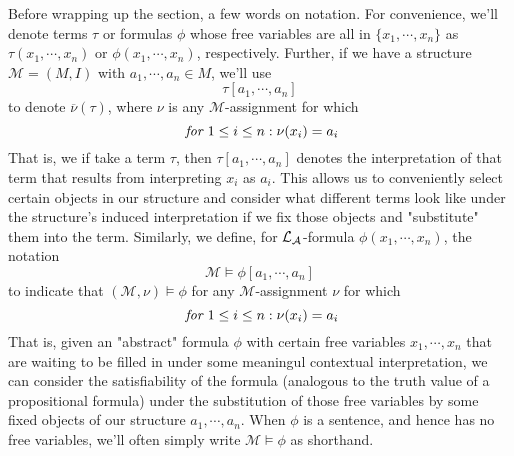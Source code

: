 \documentclass{article}
\begin{document}
\nn
Before wrapping up the section, a few words on notation. For convenience, we'll denote terms $ \tau $ or formulas $ \phi $ whose free variables are all in $ \{ x_1, \cdots, x_n \} $ as $ \tau(x_1, \cdots, x_n) $ or $ \phi(x_1, \cdots, x_n) $, respectively. Further, if we have a structure $ \mathcal{M} = (M, I) $ with $ a_1, \cdots, a_n \in M $, we'll use
    $$ \tau[a_1, \cdots, a_n] $$
to denote $ \overline{\nu}(\tau) $, where $ \nu $ is any $ \mathcal{M} $-assignment for which
    $$ \textit{ for } 1 \leq i \leq n: \nu(x_i) = a_i $$
That is, we if take a term $ \tau $, then $ \tau[a_1, \cdots, a_n] $ denotes the interpretation of that term that results from interpreting $ x_i $ as $ a_i $. This allows us to conveniently select certain objects in our structure and consider what different terms look like under the structure's induced interpretation if we fix those objects and "substitute" them into the term. Similarly, we define, for $ \mathcal{L}_{\mathcal{A}} $-formula $ \phi(x_1, \cdots, x_n) $, the notation
    $$ \mathcal{M} \vDash \phi[a_1, \cdots, a_n] $$
to indicate that $ (\mathcal{M}, \nu) \vDash \phi $ for any $ \mathcal{M} $-assignment $ \nu $ for which
    $$ \textit{ for } 1 \leq i \leq n: \nu(x_i) = a_i $$
That is, given an "abstract" formula $ \phi $ with certain free variables $ x_1, \cdots, x_n $ that are waiting to be filled in under some meaningul contextual interpretation, we can consider the satisfiability of the formula (analogous to the truth value of a propositional formula) under the substitution of those free variables by some fixed objects of our structure $ a_1, \cdots, a_n $. When $ \phi $ is a sentence, and hence has no free variables, we'll often simply write $ \mathcal{M} \vDash \phi $ as shorthand.
\end{document}
